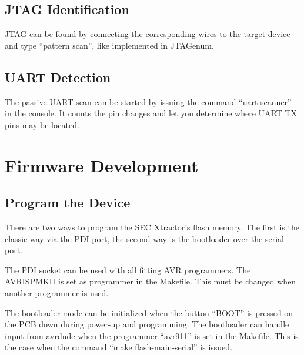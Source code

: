 \documentclass[a4paper]{report}
\begin{document}
\section{JTAG Identification}
JTAG can be found by connecting the corresponding wires to the target device and type ``pattern scan'', like implemented in JTAGenum.
\section{UART Detection}
The passive UART scan can be started by issuing the command ``uart scanner'' in the console. It counts the pin changes and let you determine where UART TX pins may be located.
\chapter{Firmware Development}
\section{Program the Device}
There are two ways to program the SEC Xtractor's flash memory.
The first is the classic way via the PDI port, the second way is the bootloader over the serial port.

The PDI socket can be used with all fitting AVR programmers. The AVRISPMKII is set as programmer in the Makefile. This must be changed when another programmer is used.

The bootloader mode can be initialized when the button ``BOOT'' is pressed on the PCB down during power-up and programming.
The bootloader can handle input from avrdude when the programmer ``avr911'' is set in the Makefile. 
This is the case when the command ``make flash-main-serial'' is issued. 
\end{document}
